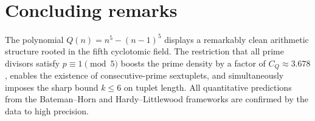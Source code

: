 \documentclass[11pt,a4paper]{article}
\theoremstyle{plain}
\theoremstyle{definition}
\theoremstyle{remark}
\begin{document}
\section{Concluding remarks}
\label{sec:conclusion}

The polynomial $Q(n) = n^5 - (n-1)^5$ displays a remarkably clean arithmetic structure rooted in the fifth cyclotomic field. The restriction that all prime divisors satisfy $p \equiv 1 \pmod{5}$ boosts the prime density by a factor of $C_Q \approx 3.678$, enables the existence of consecutive-prime sextuplets, and simultaneously imposes the sharp bound $k \le 6$ on tuplet length. All quantitative predictions from the Bateman--Horn and Hardy--Littlewood frameworks are confirmed by the data to high precision.
\end{document}
